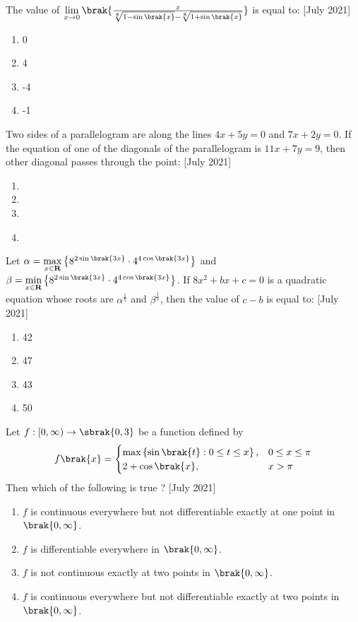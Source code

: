 \item The value of $\lim\limits_{x \rightarrow 0}\brak{\frac{x}{\sqrt[8]{1-\sin\brak{x}} - \sqrt[8]{1+\sin\brak{x}}}}$ is equal to: \hfill[July 2021]
\begin{enumerate}
    \item 0
    \item 4
    \item -4
    \item -1\\
\end{enumerate}
\item Two sides of a parallelogram are along the lines $4x + 5y = 0$ and $7x+ 2y = 0$. If the equation of one of the diagonals of the parallelogram is $11x + 7y = 9$, then other diagonal passes through the point: \hfill[July 2021]
\begin{enumerate}
    \item {}
    \item {}
    \item {}
    \item {}\\
\end{enumerate}
\item Let $\alpha = \max\limits_{x\in\textbf{R}}\left\{8^{2\sin\brak{3x}} \cdot 4^{4\cos\brak{3x}}\right\}$ and $\beta = \min\limits_{x\in\textbf{R}}\left\{8^{2\sin\brak{3x}} \cdot 4^{4\cos\brak{3x}}\right\}$. If $8x^2 + bx + c = 0$ is a quadratic equation whose roots are $\alpha^{\frac{1}{5}}$ and $\beta^{\frac{1}{5}}$, then the value of $c - b$ is equal to: \hfill[July 2021]
\begin{enumerate}
    \item 42
    \item 47
    \item 43
    \item 50\\
\end{enumerate}
\item Let $f: [0, \infty) \rightarrow \sbrak{0, 3}$ be a function defined by 
\begin{align*}
f\brak{x} =
    \begin{cases}
    \max\left\{\sin\brak{t}:0 \leq t \leq x \right\}, & 0 \leq x \leq \pi \\
    2 + \cos\brak{x}, & x > \pi
    \end{cases}
\end{align*}
Then which of the following is true ? \hfill[July 2021]
\begin{enumerate}
    \item $f$ is continuous everywhere but not differentiable exactly at one point in $\brak{0, \infty}$.
    \item $f$ is differentiable everywhere in $\brak{0, \infty}$.
    \item $f$ is not continuous exactly at two points in $\brak{0, \infty}$.
    \item $f$ is continuous everywhere but not differentiable exactly at two points in $\brak{0, \infty}$.\\
\end{enumerate}
